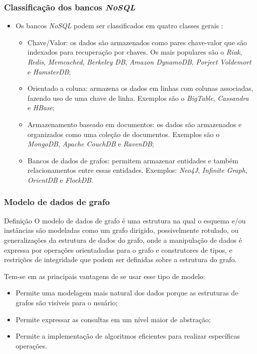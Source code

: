 \documentclass{beamer}
\begin{document}
\begin{frame}
\frametitle{Classifica\c{c}\~ao dos bancos \textit{NoSQL}}
\begin{itemize}
\item Os bancos \textit{NoSQL} podem ser classificados em quatro classes gerais
  \cite{p6}:
\begin{itemize}
\item Chave/Valor: os dados s\~ao armazenados como pares chave-valor
  que s\~ao indexados para recupera\c{c}\~ao por chaves. Os mais
  populares s\~ao o \textit{Riak}, \textit{Redis}, \textit{Memcached}, \textit{Berkeley DB}, \textit{Amazon
  DynamoDB}, \textit{Porject Voldemort} e \textit{HamsterDB};
\item Orientado a coluna: armazena os dados em linhas com colunas
  associadas, fazendo uso de uma chave de linha. Exemplos s\~ao o
  \textit{BigTable}, \textit{Cassandra} e \textit{HBase};
\item Armazenamento baseado em documentos: os dados s\~ao armazenados
  e organizados como uma cole\c{c}\~ao de documentos. Exemplos s\~ao o
  \textit{MongoDB}, \textit{Apache CouchDB} e \textit{RavenDB};
\item Bancos de dados de grafos: permitem armazenar entidades e
  tamb\'em relacionamentos entre essas entidades. Exemplos: \textit{Neo4J},
  \textit{Infinite Graph}, \textit{OrientDB} e \textit{FlockDB}.
\end{itemize}
\end{itemize}
\end{frame}


\begin{frame}
\frametitle{Modelo de dados de grafo}
\begin{block}{Defini\c{c}\~ao}
O modelo de dados de grafo \'e uma estrutura na qual o esquema e/ou
inst\^ancias s\~ao modeladas como um grafo dirigido, possivelmente
rotulado, ou generaliza\c{c}\~oes da estrutura de dados do grafo, onde
a manipula\c{c}\~ao de dados \'e expressa por opera\c{c}\~oes orientadadas
para o grafo e construtores de tipos, e restri\c{c}\~oes de
integridade que podem ser definidas sobre a estrutura do grafo. \cite{p7}
\end{block}
Tem-se em \cite{p7} as principais vantagens de se usar esse tipo de
modelo:
\begin{itemize}
\item Permite uma modelagem mais natural dos dados porque as
  estruturas de grafos s\~ao vis\'iveis para o usu\'ario;
\item Permite expressar as consultas em um n\'ivel maior de
  abstra\c{c}\~ao;
\item Permite a implementa\c{c}\~ao de algoritmos eficientes para
  realizar espec\'ificas opera\c{c}\~oes.
\end{itemize}
\end{frame}
\end{document}
